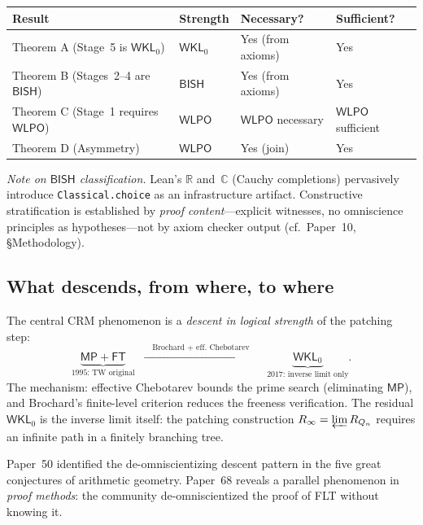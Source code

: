 \documentclass[11pt]{article}
\theoremstyle{plain}
\theoremstyle{definition}
\theoremstyle{remark}
\newcommand{\R}{\mathbb{R}}
\newcommand{\C}{\mathbb{C}}
\newcommand{\CRM}{\mathrm{CRM}}
\newcommand{\BISH}{\mathsf{BISH}}
\newcommand{\WLPO}{\mathsf{WLPO}}
\newcommand{\MP}{\mathsf{MP}}
\newcommand{\FT}{\mathsf{FT}}
\newcommand{\WKL}{\mathsf{WKL}_0}
\begin{document}
\begin{center}
\renewcommand{\arraystretch}{1.15}
\begin{tabular}{llll}
\toprule
\textbf{Result} & \textbf{Strength} & \textbf{Necessary?} & \textbf{Sufficient?} \\
\midrule
Theorem A (Stage~5 is $\WKL$) & $\WKL$ & Yes (from axioms) & Yes \\
Theorem B (Stages~2--4 are $\BISH$) & $\BISH$ & Yes (from axioms) & Yes \\
Theorem C (Stage~1 requires $\WLPO$) & $\WLPO$ & $\WLPO$ necessary & $\WLPO$ sufficient \\
Theorem D (Asymmetry) & $\WLPO$ & Yes (join) & Yes \\
\bottomrule
\end{tabular}
\end{center}

\begin{sloppypar}\smallskip\noindent
\emph{Note on $\BISH$ classification.}
Lean's $\R$ and~$\C$ (Cauchy completions) pervasively introduce
\texttt{Classical.choice} as an infrastructure artifact.
Constructive stratification is established by \emph{proof
content}---explicit witnesses, no omniscience principles as
hypotheses---not by axiom checker output
(cf.\ Paper~10, \S Methodology).
\end{sloppypar}

\subsection{What descends, from where, to where}

The central $\CRM$ phenomenon is a \emph{descent in logical
strength} of the patching step:
\[
\underbrace{\MP + \FT}_{\text{1995: TW original}} \;\;\xrightarrow{\quad\text{Brochard + eff.\ Chebotarev}\quad}\;\; \underbrace{\WKL}_{\text{2017: inverse limit only}}.
\]
The mechanism: effective Chebotarev bounds the prime search
(eliminating $\MP$), and Brochard's finite-level criterion
reduces the freeness verification.  The residual $\WKL$
is the inverse limit itself: the patching construction
$R_\infty = \varprojlim R_{Q_n}$ requires an infinite path
in a finitely branching tree.

Paper~50 \cite{Paper50} identified the de-omniscientizing descent
pattern in the five great conjectures of arithmetic geometry.
Paper~68 reveals a parallel phenomenon in \emph{proof methods}:
the community de-omniscientized the proof of FLT without knowing it.
\end{document}
